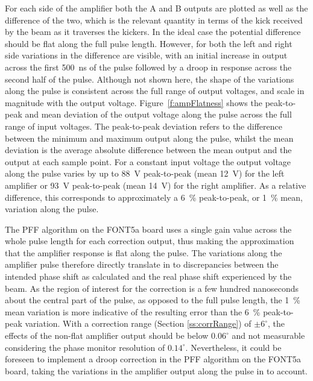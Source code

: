 For each side of the amplifier both the A and B outputs are plotted as well as the difference of the two, which is the relevant quantity in terms of the kick received by the beam as it traverses the kickers. In the ideal case the potential difference should be flat along the full pulse length. However, for both the left and right side variations in the difference are visible, with an initial increase in output across the first 500~ns of the pulse followed by a droop in response across the second half of the pulse. Although not shown here, the shape of the variations along the pulse is consistent across the full range of output voltages, and scale in magnitude with the output voltage. Figure~\ref{f:ampFlatness} shows the peak-to-peak and mean deviation of the output voltage along the pulse across the full range of input voltages. The peak-to-peak deviation refers to the difference between the minimum and maximum output along the pulse, whilst the mean deviation is the average absolute difference between the mean output and the output at each sample point. For a constant input voltage the output voltage along the pulse varies by up to 88~V peak-to-peak (mean 12~V) for the left amplifier or 93~V peak-to-peak (mean 14~V) for the right amplifier. As a relative difference, this corresponds to approximately a 6~\% peak-to-peak, or 1~\% mean, variation along the pulse.

The PFF algorithm on the FONT5a board uses a single gain value across the whole pulse length for each correction output, thus making the approximation that the amplifier response is flat along the pulse. The variations along the amplifier pulse therefore directly translate in to discrepancies between the intended phase shift as calculated and the real phase shift experienced by the beam. As the region of interest for the correction is a few hundred nanoseconds about the central part of the pulse, as opposed to the full pulse length, the 1~\% mean variation is more indicative of the resulting error than the 6~\% peak-to-peak variation. With a correction range (Section \ref{ss:corrRange}) of \(\pm6^\circ\), the effects of the non-flat amplifier output should be below \(0.06^\circ\) and not measurable considering the phase monitor resolution of \(0.14^\circ\). Nevertheless, it could be foreseen to implement a droop correction in the PFF algorithm on the FONT5a board, taking the variations in the amplifier output along the pulse in to account.

